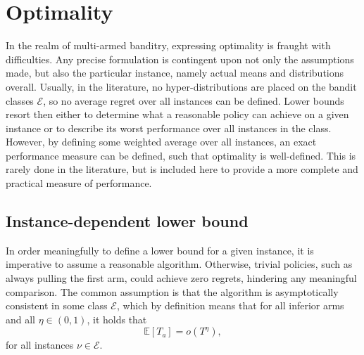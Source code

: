 \section{Optimality}
\label{sec:optimality}
In the realm of multi-armed banditry, expressing optimality is fraught with difficulties.
Any precise formulation is contingent upon not only the assumptions made, but also the particular instance, namely actual means and distributions overall.
Usually, in the literature, no hyper-distributions are placed on the bandit classes $\mathcal{E}$, so no average regret over all instances can be defined.
Lower bounds resort then either to determine what a reasonable policy can achieve on a given instance or to describe its worst performance over all instances in the class.
However, by defining some weighted average over all instances, an exact performance measure can be defined, such that optimality is well-defined.
This is rarely done in the literature, but is included here to provide a more complete and practical measure of performance.

\subsection{Instance-dependent lower bound}
In order meaningfully to define a lower bound for a given instance, it is imperative to assume a reasonable algorithm.
Otherwise, trivial policies, such as always pulling the first arm, could achieve zero regrets, hindering any meaningful comparison.
The common assumption is that the algorithm is asymptotically consistent in some class $\mathcal{E}$, which by definition means that for all inferior arms and all $\eta \in (0, 1)$, it holds that\footnotemark
\begin{equation}
    \mathbb{E}[T_a] = o(T^{\eta}),
\end{equation}
for all instances $\nu \in \mathcal{E}$.


